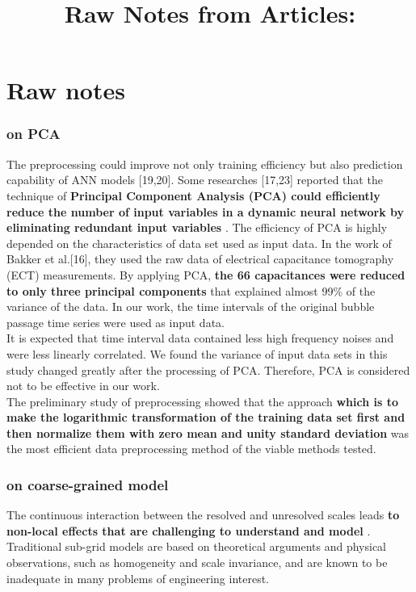 \documentclass[a4paper,12pt]{article}
\title{\navy \textbf{Raw Notes from Articles: \color{black}}}%
\date{}
\newcommand\bk{\color{black}}
\newcommand\red{\color{red}}
\numberwithin{equation}{section} %
\begin{document}
\section*{Raw notes}
\subsubsection*{\citep{LIN2003611} on PCA}
The preprocessing could improve not only training efficiency but also prediction capability of ANN models [19,20]. Some researches [17,23] reported that the technique of \red \textbf{Principal Component Analysis (PCA) could efficiently reduce the number of input variables in a dynamic neural network by eliminating redundant input variables} \bk. The efficiency of PCA is highly depended on the characteristics of data set used as input data. In the work of Bakker et al.[16], they used the raw data of electrical capacitance tomography (ECT) measurements. By applying PCA, \red \textbf{the 66 capacitances were reduced to only three principal components} \bk that explained almost 99\% of the variance of the data. In our work, the time intervals of the original bubble passage time series were used as input data. \\
It is expected that time interval data contained less high frequency noises and were less linearly correlated. We found the variance of input data sets in this study changed greatly after the processing of PCA. Therefore, PCA is considered not to be effective in our work.\\
The preliminary study of preprocessing showed that the approach \red \textbf{which is to make the logarithmic transformation of the training data set first and then normalize them with zero mean and unity  standard deviation} \bk was the most efficient data preprocessing method of the viable methods tested.

\subsubsection*{\citep{parish2016reduced} on coarse-grained model}
The continuous interaction between the resolved and unresolved scales leads \red \textbf{to non-local effects that are challenging to understand and model} \bk. Traditional sub-grid models are based on theoretical arguments and physical observations, such as homogeneity and scale invariance, and are known to be inadequate in many problems of engineering interest.


\subsubsection*{\citep{khosravi2011comprehensive}}
\end{document}
